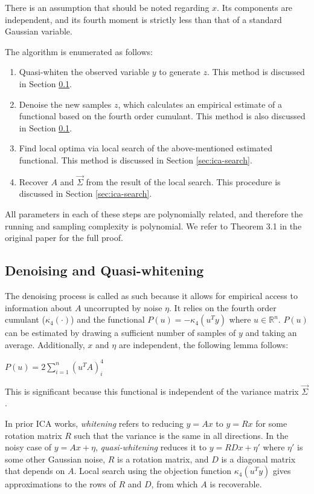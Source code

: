 There is an assumption that should be noted regarding $x$. Its
components are independent, and its fourth moment is strictly less
than that of a standard Gaussian variable.

The algorithm is enumerated as follows:
\begin{enumerate}
    \item Quasi-whiten the observed variable $y$ to generate $z$.
    This method is discussed in Section \ref{sec:ica-qwhitening}.
    \item Denoise the new samples $z$, which calculates an empirical
    estimate of a functional based on the fourth order cumulant. This
    method is also discussed in Section \ref{sec:ica-qwhitening}.
    \item Find local optima via local search of the above-mentioned
    estimated functional. This method is discussed in Section
    \ref{sec:ica-search}.
    \item Recover $A$ and $\vec{\Sigma}$ from the result of the local
    search. This procedure is discussed in Section
    \ref{sec:ica-search}.
\end{enumerate}

All parameters in each of these steps are polynomially related, and
therefore the running and sampling complexity is polynomial. We refer
to Theorem 3.1 in the original paper for the full proof.

\subsection{Denoising and Quasi-whitening} \label{sec:ica-qwhitening}

The denoising process is called as such because it allows for
empirical access to information about $A$ uncorrupted by noise
$\eta$. It relies on the fourth order cumulant ($\kappa_4(\cdot)$)
and the functional $P(u) = -\kappa_4 (u^T y)$ where $u \in
\mathbb{R}^n$. $P(u)$ can be estimated by drawing a sufficient number
of samples of $y$ and taking an average. Additionally, $x$ and $\eta$
are independent, the following lemma follows:

\begin{lemma}
    $P(u) = 2 \sum_{i=1}^n (u^T A)_i^4$
\end{lemma}

This is significant because this functional is independent of the variance matrix $\vec{\Sigma}$.

In prior ICA works, \textit{whitening} refers to reducing $y = Ax$ to
$y = Rx$ for some rotation matrix $R$ such that the variance is the
same in all directions. In the noisy case of $y = Ax + \eta$,
\textit{quasi-whitening} reduces it to $y = RDx + \eta'$ where
$\eta'$ is some other Gaussian noise, $R$ is a rotation matrix, and
$D$ is a diagonal matrix that depends on $A$. Local search using the
objection function $\kappa_4(u^T y)$ gives approximations to the rows
of $R$ and $D$, from which $A$ is recoverable.


